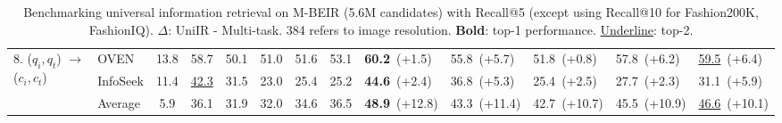 \begin{table}
{\begin{tabular}{ll|c|ccccc|lllll}
         \midrule
         \multirow{2}{*}{8. ($q_i, q_t$) $\to$ ($c_i, c_t$)}
         & OVEN                       & 13.8& 58.7 & 50.1 & 51.0 & 51.6 & 53.1  & \textbf{60.2}~\textcolor{positive}{\large (+1.5)} & 55.8~\textcolor{positive}{\large (+5.7)}& 51.8~\textcolor{positive}{\large (+0.8)}& 57.8~\textcolor{positive}{\large (+6.2)}& \underline{59.5}~\textcolor{positive}{\large (+6.4)}\\
          & InfoSeek               & 11.4& \underline{42.3} & 31.5 & 23.0 & 25.4 & 25.2  & \textbf{44.6}~\textcolor{positive}{\large (+2.4)} & 36.8~\textcolor{positive}{\large (+5.3)}& 25.4~\textcolor{positive}{\large (+2.5)}& 27.7~\textcolor{positive}{\large (+2.3)}& 31.1~\textcolor{positive}{\large (+5.9)}\\
         \midrule
         & Average     & 5.9& 36.1 & 31.9 & 32.0 & 34.6 & 36.5  & \textbf{48.9}~\textcolor{positive}{\large (+12.8)} & 43.3~\textcolor{positive}{\large (+11.4)}& 42.7~\textcolor{positive}{\large (+10.7)}& 45.5~\textcolor{positive}{\large (+10.9)}& \underline{46.6}~\textcolor{positive}{\large (+10.1)}\\



         \bottomrule
    \end{tabular}
    }
    \caption{Benchmarking universal information retrieval on M-BEIR (5.6M candidates) with Recall@5 (except using Recall@10 for Fashion200K, FashionIQ). 
    $\Delta$: UniIR - Multi-task. 384 refers to image resolution. \textbf{Bold}: top-1 performance. \underline{Underline}: top-2.}
    \label{tab:union_small}
    \vspace{-2pt}
\end{table}